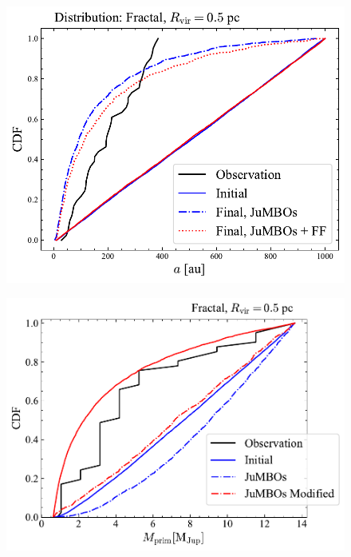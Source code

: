\documentclass[aa]{lib/aa}
\begin{document}
\begin{figure}
    \centering
        \includegraphics[width=.91\columnwidth]{figures/sem_axis_Fractal_FF.pdf}
        \caption{}
         \label{Fig:Fr_semimajor_axis}
\end{figure}

\begin{figure}
    \centering
        \includegraphics[width=.91\columnwidth]{figures/mprim_vs_obs_Fractal0.5Mod.pdf}
        \caption{}
         \label{Fig:Fr_primar_mass}
\end{figure}
\end{document}
